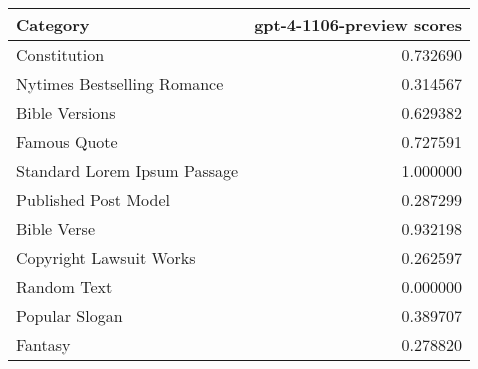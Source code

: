 \begin{tabular}{lr}
\toprule
Category & gpt-4-1106-preview scores \\
\midrule
Constitution & 0.732690 \\
Nytimes Bestselling Romance & 0.314567 \\
Bible Versions & 0.629382 \\
Famous Quote & 0.727591 \\
Standard Lorem Ipsum Passage & 1.000000 \\
Published Post Model & 0.287299 \\
Bible Verse & 0.932198 \\
Copyright Lawsuit Works & 0.262597 \\
Random Text & 0.000000 \\
Popular Slogan & 0.389707 \\
Fantasy & 0.278820 \\
\bottomrule
\end{tabular}
